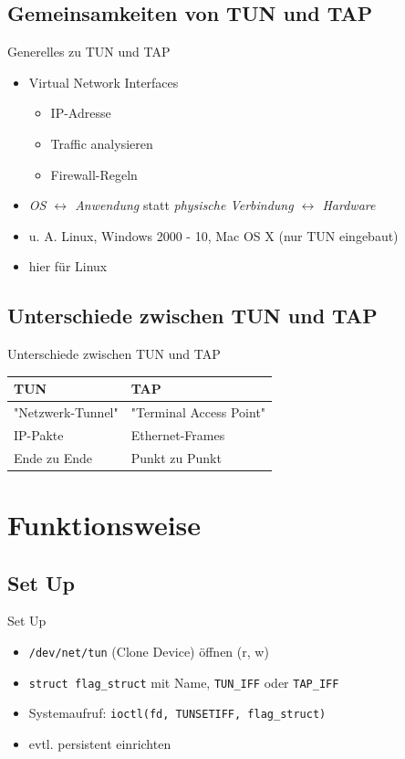 \documentclass[ngerman,aspectratio=169]{beamer}
\begin{document}
	\subsection{Gemeinsamkeiten von TUN und TAP}
	\begin{frame}{Generelles zu TUN und TAP}
		\begin{itemize}
			\item Virtual Network Interfaces
			\begin{itemize}
				\item IP-Adresse
				\item Traffic analysieren
				\item Firewall-Regeln
			\end{itemize}
			\item \textit{OS $ \leftrightarrow $ Anwendung} statt \textit{physische Verbindung $ \leftrightarrow $ Hardware}
			\item u. A. Linux, Windows 2000 - 10, Mac OS X (nur TUN eingebaut)
			\item hier für Linux
		\end{itemize}
	\end{frame}

	\subsection{Unterschiede zwischen TUN und TAP}
	\begin{frame}{Unterschiede zwischen TUN und TAP}
		\renewcommand{\arraystretch}{1.5}
		\begin{tabular}{p{.5\linewidth}|p{.5\linewidth}}
			\textbf{TUN} & \textbf{TAP} \\\hline
			"Netzwerk-Tunnel" & "Terminal Access Point"\\\hline
			IP-Pakte & Ethernet-Frames\\\hline
			Ende zu Ende & Punkt zu Punkt
		\end{tabular}
	\end{frame}

	\section{Funktionsweise}
	\subsection{Set Up}
	\begin{frame}{Set Up}
		\begin{itemize}
			\item \texttt{/dev/net/tun} (Clone Device) öffnen (r, w)
			\item \texttt{struct flag\_struct} mit Name, \texttt{TUN\_IFF} oder \texttt{TAP\_IFF}
			\item Systemaufruf: \texttt{ioctl(fd, TUNSETIFF, flag\_struct)}
			\item evtl. persistent einrichten
		\end{itemize}
	\end{frame}
\end{document}

